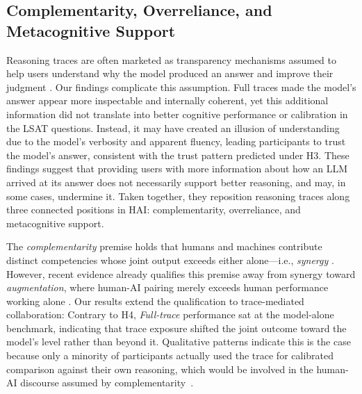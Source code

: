 \documentclass[manuscript,review,anonymous]{acmart}
\let\xtodo\todo
\renewcommand{\todo}[1]{\xtodo[inline,color=green!50]{#1}}
\newcommand{\todoredundant}[1]{\xtodo[inline,color=red!35]{\textbf{REDUNDANT:} #1}}
\begin{document}
\subsection{Complementarity, Overreliance, and Metacognitive Support}

Reasoning traces are often marketed as transparency mechanisms assumed to help users understand why the model produced an answer and improve their judgment \cite{openai2024learning,openai2025monitorability,anthropic2025extended,anthropic2025think}. Our findings complicate this assumption. Full traces made the model's answer appear more inspectable and internally coherent, yet this additional information did not translate into better cognitive performance or calibration in the LSAT questions. Instead, it may have created an illusion of understanding \cite{fisher2021harder} due to the model's verbosity and apparent fluency, leading participants to trust the model's answer, consistent with the trust pattern predicted under H3.
These findings suggest that providing users with more information about how an LLM arrived at its answer does not necessarily support better reasoning, and may, in some cases, undermine it. Taken together, they reposition reasoning traces along three connected positions in HAI: complementarity, overreliance, and metacognitive support.

The \textit{complementarity} premise holds that humans and machines contribute distinct competencies whose joint output exceeds either alone---i.e., \textit{synergy} \cite{vaccaro2024combinations}. However, recent evidence already qualifies this premise away from synergy toward \textit{augmentation}, where human-AI pairing merely exceeds human performance working alone \cite{vaccaro2024combinations,FERNANDES2026108779}. Our results extend the qualification to trace-mediated collaboration: Contrary to H4, \textit{Full-trace} performance sat at the model-alone benchmark, indicating that trace exposure shifted the joint outcome toward the model's level rather than beyond it.  Qualitative patterns indicate this is the case because only a minority of participants actually used the trace for calibrated comparison against their own reasoning, which would be involved in the human-AI discourse assumed by complementarity~\cite{FERNANDES2026108779}.%
\end{document}
